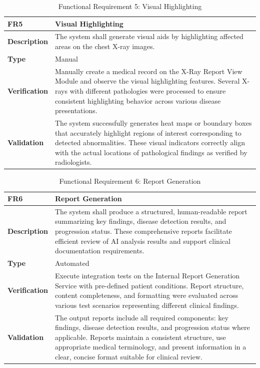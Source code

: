 \documentclass[12pt, titlepage]{article}
\begin{document}
\begin{table}[h!]
\centering
{}
\begin{tabular}{|p{3.5cm}|p{11.5cm}|}
\hline
\rowcolor{gray!30}
\textbf{FR5} & \textbf{Visual Highlighting} \\
\hline
\textbf{Description} & The system shall generate visual aids by highlighting affected areas on the chest X-ray images.\\
\hline
\textbf{Type} & Manual \\
\hline
\textbf{Verification} & Manually create a medical record on the X-Ray Report View Module and observe the visual highlighting features. Several X-rays with different pathologies were processed to ensure consistent highlighting behavior across various disease presentations. \\
\hline
\textbf{Validation} & The system successfully generates heat maps or boundary boxes that accurately highlight regions of interest corresponding to detected abnormalities. These visual indicators correctly align with the actual locations of pathological findings as verified by radiologists. \\
\hline
\end{tabular}
\caption{Functional Requirement 5: Visual Highlighting}
\end{table}

\begin{table}[h!]
\centering
{}
\begin{tabular}{|p{3.5cm}|p{11.5cm}|}
\hline
\rowcolor{gray!30}
\textbf{FR6} & \textbf{Report Generation} \\
\hline
\textbf{Description} & The system shall produce a structured, human-readable report summarizing key findings, disease detection results, and progression status. These comprehensive reports facilitate efficient review of AI analysis results and support clinical documentation requirements. \\
\hline
\textbf{Type} & Automated \\
\hline
\textbf{Verification} & Execute integration tests on the Internal Report Generation Service with pre-defined patient conditions. Report structure, content completeness, and formatting were evaluated across various test scenarios representing different clinical findings. \\
\hline
\textbf{Validation} & The output reports include all required components: key findings, disease detection results, and progression status where applicable. Reports maintain a consistent structure, use appropriate medical terminology, and present information in a clear, concise format suitable for clinical review. \\
\hline
\end{tabular}
\caption{Functional Requirement 6: Report Generation}
\end{table}
\end{document}
